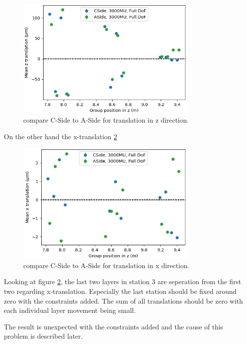 \begin{figure}
  \centering
  \includegraphics[width=0.8\textwidth]{plots/renewed_plots/CA_allT_halfT3_Tz.png}
  \caption{compare C-Side to A-Side for translation in z direction.}
  \label{fig:june_5}
\end{figure}
On the other hand the x-translation \ref{fig:june_6}
\begin{figure}
  \centering
  \includegraphics[width=0.8\textwidth]{plots/renewed_plots/CA_allT_halfT3_Tx.png}
  \caption{compare C-Side to A-Side for translation in x direction.}
  \label{fig:june_6}
\end{figure}

Looking at figure \ref{fig:june_6}, the last two layers in station 3 are
seperation from the first two regarding x-translation. Especially the last
station should be fixed around zero with the constraints added. The sum of
all translations should be zero with each individual layer movement being small.

The result is unexpected with the constraints added and the cause of this
problem is described later.

